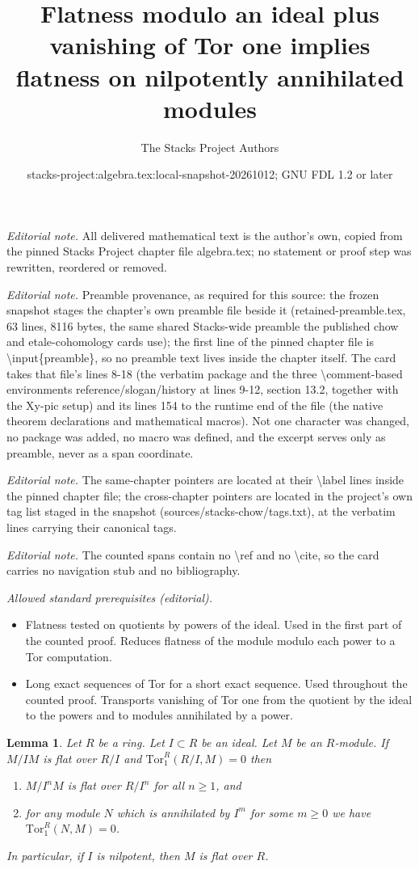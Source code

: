 \documentclass[10pt,a4paper]{amsart}
\title{Flatness modulo an ideal plus vanishing of Tor one implies flatness on nilpotently annihilated modules}
\author{The Stacks Project Authors}
\date{stacks-project:algebra.tex:local-snapshot-20261012; GNU FDL 1.2 or later}
\theoremstyle{plain}
\newtheorem{lemma}[subsection]{Lemma}
\theoremstyle{definition}
\theoremstyle{remark}
\numberwithin{equation}{subsection}
\begin{document}
\maketitle
\noindent\textit{Editorial note.} All delivered mathematical text is the author's own, copied from the pinned Stacks Project chapter file algebra.tex; no statement or proof step was rewritten, reordered or removed.\par\medskip
\noindent\textit{Editorial note.} Preamble provenance, as required for this source: the frozen snapshot stages the chapter's own preamble file beside it (retained-preamble.tex, 63 lines, 8116 bytes, the same shared Stacks-wide preamble the published chow and etale-cohomology cards use); the first line of the pinned chapter file is \textbackslash{}input\{preamble\}, so no preamble text lives inside the chapter itself. The card takes that file's lines 8-18 (the verbatim package and the three \textbackslash{}comment-based environments reference/slogan/history at lines 9-12, section 13.2, together with the Xy-pic setup) and its lines 154 to the runtime end of the file (the native theorem declarations and mathematical macros). Not one character was changed, no package was added, no macro was defined, and the excerpt serves only as preamble, never as a span coordinate.\par\medskip
\noindent\textit{Editorial note.} The same-chapter pointers are located at their \textbackslash{}label lines inside the pinned chapter file; the cross-chapter pointers are located in the project's own tag list staged in the snapshot (sources/stacks-chow/tags.txt), at the verbatim lines carrying their canonical tags.\par\medskip
\noindent\textit{Editorial note.} The counted spans contain no \textbackslash{}ref and no \textbackslash{}cite, so the card carries no navigation stub and no bibliography.\par\medskip
\noindent\textit{Allowed standard prerequisites (editorial).}\begin{itemize}
\item Flatness tested on quotients by powers of the ideal. Used in the first part of the counted proof. Reduces flatness of the module modulo each power to a Tor computation.
\item Long exact sequences of Tor for a short exact sequence. Used throughout the counted proof. Transports vanishing of Tor one from the quotient by the ideal to the powers and to modules annihilated by a power.
\end{itemize}\medskip
\begin{lemma}
\label{lemma-what-does-it-mean}
Let $R$ be a ring.
Let $I \subset R$ be an ideal.
Let $M$ be an $R$-module.
If $M/IM$ is flat over $R/I$ and $\text{Tor}_1^R(R/I, M) = 0$ then
\begin{enumerate}
\item $M/I^nM$ is flat over $R/I^n$ for all $n \geq 1$, and
\item for any module $N$ which is annihilated by $I^m$ for some $m \geq 0$
we have $\text{Tor}_1^R(N, M) = 0$.
\end{enumerate}
In particular, if $I$ is nilpotent, then $M$ is flat over $R$.
\end{lemma}
\end{document}
